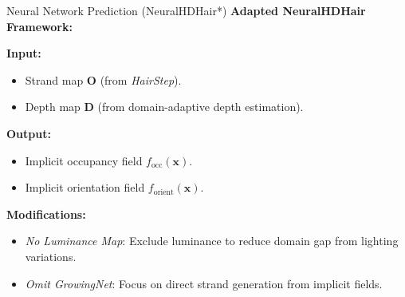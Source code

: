 \begin{frame}[t]{Neural Network Prediction (NeuralHDHair*)}
    \textbf{Adapted NeuralHDHair Framework:}

    \vspace{5pt}

    \textbf{Input:}
    \begin{itemize}
        \item Strand map $\mathbf{O}$ (from \emph{HairStep}).
        \item Depth map $\mathbf{D}$ (from domain-adaptive depth estimation).
    \end{itemize}

    \vspace{5pt}

    \textbf{Output:}
    \begin{itemize}
        \item Implicit occupancy field $f_{\text{occ}}(\mathbf{x})$.
        \item Implicit orientation field $f_{\text{orient}}(\mathbf{x})$.
    \end{itemize}

    \vspace{5pt}

    \textbf{Modifications:}
    \begin{itemize}
        \item \emph{No Luminance Map}: Exclude luminance to reduce domain gap from lighting variations.
        \item \emph{Omit GrowingNet}: Focus on direct strand generation from implicit fields.
    \end{itemize}
\end{frame}

